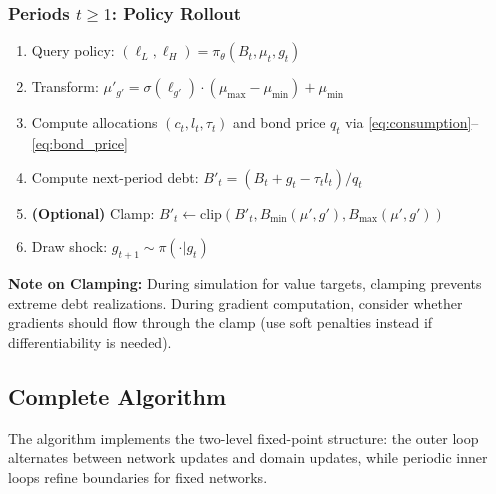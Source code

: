\subsubsection{Periods $t \geq 1$: Policy Rollout}
\begin{enumerate}
    \item Query policy: $(\ell_L, \ell_H) = \pi_\theta(B_t, \mu_t, g_t)$
    \item Transform: $\mu'_{g'} = \sigma(\ell_{g'}) \cdot (\mu_{\max} - \mu_{\min}) + \mu_{\min}$
    \item Compute allocations $(c_t, l_t, \tau_t)$ and bond price $q_t$ via \eqref{eq:consumption}--\eqref{eq:bond_price}
    \item Compute next-period debt: $B'_t = (B_t + g_t - \tau_t l_t) / q_t$
    \item \textbf{(Optional)} Clamp: $B'_t \leftarrow \text{clip}(B'_t, B_{\min}(\mu', g'), B_{\max}(\mu', g'))$
    \item Draw shock: $g_{t+1} \sim \pi(\cdot | g_t)$
\end{enumerate}

\textbf{Note on Clamping:} During simulation for value targets, clamping prevents extreme debt realizations. During gradient computation, consider whether gradients should flow through the clamp (use soft penalties instead if differentiability is needed).


\subsection{Complete Algorithm}

The algorithm implements the two-level fixed-point structure: the outer loop alternates between network updates and domain updates, while periodic inner loops refine boundaries for fixed networks.

